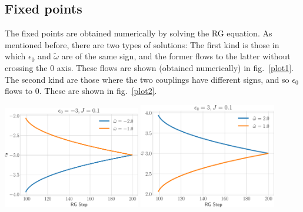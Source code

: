 \documentclass[twoside,11pt]{report}
\numberwithin{equation}{section}
\begin{document}
\subsection{Fixed points}
The fixed points are obtained numerically by solving the RG equation. As mentioned before, there are two types of solutions: The first kind is those in which \(\epsilon_0\) and \(\tilde \omega\) are of the same sign, and the former flows to the latter without crossing the 0 axis. These flows are shown (obtained numerically) in fig.~\ref{plot1}. The second kind are those where the two couplings have different signs, and so \(\epsilon_0\) flows to 0. These are shown in fig.~\ref{plot2}.
\begin{center}
	\includegraphics[width=0.45\textwidth]{../figures/notzero1.pdf}
	\hspace*{\fill}
	\includegraphics[width=0.45\textwidth]{../figures/notzero2.pdf}
	\label{plot1}
\end{center}
\end{document}
